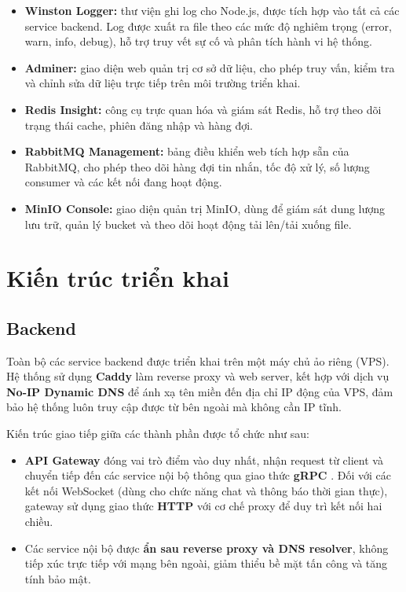 \begin{itemize}
    \item \textbf{Winston Logger:} thư viện ghi log cho Node.js, được tích hợp vào tất cả các service backend. Log được xuất ra file theo các mức độ nghiêm trọng (error, warn, info, debug), hỗ trợ truy vết sự cố và phân tích hành vi hệ thống.
    \item \textbf{Adminer:} giao diện web quản trị cơ sở dữ liệu, cho phép truy vấn, kiểm tra và chỉnh sửa dữ liệu trực tiếp trên môi trường triển khai.
    \item \textbf{Redis Insight:} công cụ trực quan hóa và giám sát Redis, hỗ trợ theo dõi trạng thái cache, phiên đăng nhập và hàng đợi.
    \item \textbf{RabbitMQ Management:} bảng điều khiển web tích hợp sẵn của RabbitMQ, cho phép theo dõi hàng đợi tin nhắn, tốc độ xử lý, số lượng consumer và các kết nối đang hoạt động.
    \item \textbf{MinIO Console:} giao diện quản trị MinIO, dùng để giám sát dung lượng lưu trữ, quản lý bucket và theo dõi hoạt động tải lên/tải xuống file.
\end{itemize}

\section{Kiến trúc triển khai}

\subsection{Backend}

Toàn bộ các service backend được triển khai trên một máy chủ ảo riêng (VPS). Hệ thống sử dụng \textbf{Caddy} \cite{caddy_docs} làm reverse proxy và web server, kết hợp với dịch vụ \textbf{No-IP Dynamic DNS} để ánh xạ tên miền đến địa chỉ IP động của VPS, đảm bảo hệ thống luôn truy cập được từ bên ngoài mà không cần IP tĩnh.

Kiến trúc giao tiếp giữa các thành phần được tổ chức như sau:

\begin{itemize}
    \item \textbf{API Gateway} đóng vai trò điểm vào duy nhất, nhận request từ client và chuyển tiếp đến các service nội bộ thông qua giao thức \textbf{gRPC} \cite{grpc_docs}. Đối với các kết nối WebSocket (dùng cho chức năng chat và thông báo thời gian thực), gateway sử dụng giao thức \textbf{HTTP} với cơ chế proxy để duy trì kết nối hai chiều.
    \item Các service nội bộ được \textbf{ẩn sau reverse proxy và DNS resolver}, không tiếp xúc trực tiếp với mạng bên ngoài, giảm thiểu bề mặt tấn công và tăng tính bảo mật.
\end{itemize}

